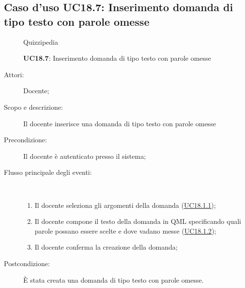 \subsection{Caso d'uso UC18.7: Inserimento domanda di tipo testo con parole omesse}
	\begin{figure}[H]
		\centering
		\begin{resizedtikzpicture}{\textwidth}
		\begin{umlsystem}[x=0, fill=lightgray!20]{Quizzipedia}
		\end{umlsystem}
		\end{resizedtikzpicture}
		\caption{\textbf{UC18.7}: Inserimento domanda di tipo testo con parole omesse}
		\label{UC18.7}
	\end{figure}
\begin{description}
\item[Attori:] Docente;
\item[Scopo e descrizione:] Il docente inserisce una domanda di tipo testo con parole omesse
      \item[Precondizione:] Il docente è autenticato presso il sistema;

        \item[Flusso principale degli eventi:] \ 
 \begin{enumerate}
          \item Il docente seleziona gli argomenti della domanda (\hyperlink{UC18.1.1}{UC18.1.1});
          \item Il docente compone il testo della domanda in QML specificando quali parole possano essere scelte e dove vadano messe  (\hyperlink{UC18.1.2}{UC18.1.2});
          \item Il docente conferma la creazione della domanda;

      \end{enumerate}
    \item[Postcondizione:] È stata creata una domanda di tipo testo con parole omesse.
  \end{description}
\hypertarget{UC18.8}{}
